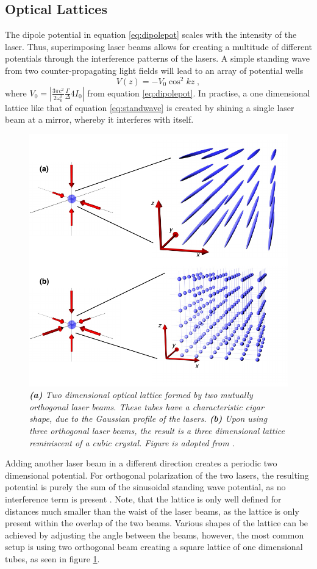 \subsection{Optical Lattices}

The dipole potential in equation \eqref{eq:dipolepot} scales with the intensity of the laser. Thus, superimposing laser beams allows for creating a multitude of different potentials through the interference patterns of the lasers. A simple standing wave from two counter-propagating light fields will lead to an array of potential wells
\begin{equation}
	V(z) = - V_0 \cos^2{k z } \; ,
	\label{eq:standwave}
\end{equation}
 where $V_0 = | \frac{3 \pi c^2}{2 \omega_{0}^3} \frac{\Gamma}{\Delta} 4 I_0 |$ from equation \eqref{eq:dipolepot}. In practise, a one dimensional lattice like that of equation \eqref{eq:standwave} is created by shining a single laser beam at a mirror, whereby it interferes with itself.
\begin{figure}[!h]
	\centering
	\includegraphics[width=0.7\columnwidth]{Figures/OpticalLattice.pdf} 
	\caption{\textit{\textbf{(a)} Two dimensional optical lattice formed by two mutually orthogonal laser beams. These tubes have a characteristic cigar shape, due to the Gaussian profile of the lasers. \textbf{(b)} Upon using three orthogonal laser beams, the result is a three dimensional lattice reminiscent of a cubic crystal. Figure is adopted from \cite{WideraThesis}.}}
	\label{fig:OpticalLattice} 
\end{figure}
Adding another laser beam in a different direction creates a periodic two dimensional potential. For orthogonal polarization of the two lasers, the resulting potential is purely the sum of the sinusoidal standing wave potential, as no interference term is present \cite{lewenstein}. Note, that the lattice is only well defined for distances much smaller than the waist of the laser beams, as the lattice is only present within the overlap of the two beams. Various shapes of the lattice can be achieved by adjusting the angle between the beams, however, the most common setup is using two orthogonal beam creating a square lattice of one dimensional tubes, as seen in figure \ref{fig:OpticalLattice}.
